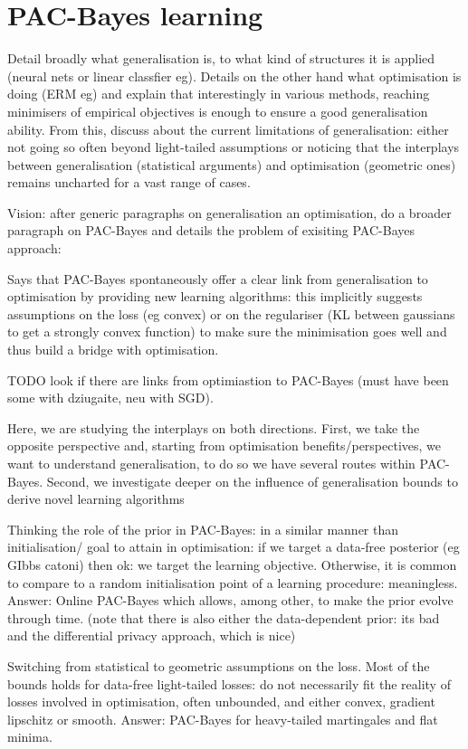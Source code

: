 \section{PAC-Bayes learning}

\newpage
Detail broadly what generalisation is, to what kind of structures it is applied (neural nets or linear classfier eg). Details on the other hand what optimisation is doing (ERM eg) and explain that interestingly in various methods, reaching minimisers of empirical objectives is enough to ensure a good generalisation ability. From this, discuss about the current limitations of generalisation: either not going so often beyond light-tailed assumptions or noticing that the interplays between generalisation (statistical arguments) and optimisation (geometric ones) remains uncharted for a vast range of cases.

Vision: after generic paragraphs on generalisation an optimisation, do a broader paragraph on PAC-Bayes and details the problem of exisiting PAC-Bayes approach: 

Says that PAC-Bayes spontaneously offer a clear link from generalisation to optimisation by providing new learning algorithms: this implicitly suggests assumptions on the loss (eg convex) or on the regulariser (KL between gaussians to get a strongly convex function) to make sure the minimisation goes well and thus build a bridge with optimisation.

TODO look if there are links from optimiastion to PAC-Bayes (must have been some with dziugaite, neu with SGD).

Here, we are studying the interplays on both directions. First, we take the opposite perspective and, starting from optimisation benefits/perspectives, we want to understand generalisation, to do so we have several routes within PAC-Bayes. Second, we investigate deeper on the influence of generalisation bounds to derive novel learning algorithms

Thinking the role of the prior in PAC-Bayes: in a similar manner than initialisation/ goal to attain in optimisation: if we target a data-free posterior (eg GIbbs catoni) then ok: we target the learning objective. Otherwise, it is common to compare to a random initialisation point of a learning procedure: meaningless. Answer: Online PAC-Bayes which allows, among other, to make the prior evolve through time. (note that there is also either the data-dependent prior: its bad and the differential privacy approach, which is nice)

Switching from statistical to geometric assumptions on the loss. Most of the bounds holds for data-free light-tailed losses: do not necessarily fit the reality of losses involved in optimisation, often unbounded, and either convex, gradient lipschitz or smooth. Answer: PAC-Bayes for heavy-tailed martingales and flat minima.

